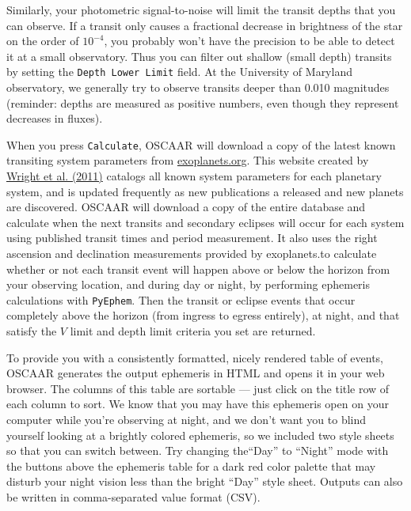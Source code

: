 \documentclass[a4paper]{article}
\newcommand{\code}[1]{\texttt{#1}}
\begin{document}
Similarly, your photometric signal-to-noise will limit the transit depths that you can observe. If a transit only causes a fractional decrease in brightness of the star on the order of $10^{-4}$, you probably won't have the precision to be able to detect it at a small observatory. Thus you can filter out shallow (small depth) transits by setting the \code{Depth Lower Limit} field. At the University of Maryland observatory, we generally try to observe transits deeper than 0.010 magnitudes (reminder: depths are measured as positive numbers, even though they represent decreases in fluxes).

When you press \code{Calculate}, OSCAAR will download a copy of the latest known transiting system parameters from \href{http://www.exoplanets.org/}{exoplanets.org}. This website created by \href{http://adsabs.harvard.edu/abs/2011PASP..123..412W}{Wright et al. (2011)} catalogs all known system parameters for each planetary system, and is updated frequently as new publications a released and new planets are discovered. OSCAAR will download a copy of the entire database and calculate when the next transits and secondary eclipses will occur for each system using published transit times and period measurement. It also uses the right ascension and declination measurements provided by exoplanets.\@org to calculate whether or not each transit event will happen above or below the horizon from your observing location, and during day or night, by performing ephemeris calculations with \code{PyEphem}. Then the transit or eclipse events that occur completely above the horizon (from ingress to egress entirely), at night, and that satisfy the $V$ limit and depth limit criteria you set are returned. 

To provide you with a consistently formatted, nicely rendered table of events, OSCAAR generates the output ephemeris in HTML and opens it in your web browser. The columns of this table are sortable --- just click on the title row of each column to sort. We know that you may have this ephemeris open on your computer while you're observing at night, and we don't want you to blind yourself looking at a brightly colored ephemeris, so we included two style sheets so that you can switch between. Try changing the``Day'' to ``Night'' mode with the buttons above the ephemeris table for a dark red color palette that may disturb your night vision less than the bright ``Day'' style sheet. Outputs can also be written in comma-separated value format (CSV).
\end{document}
